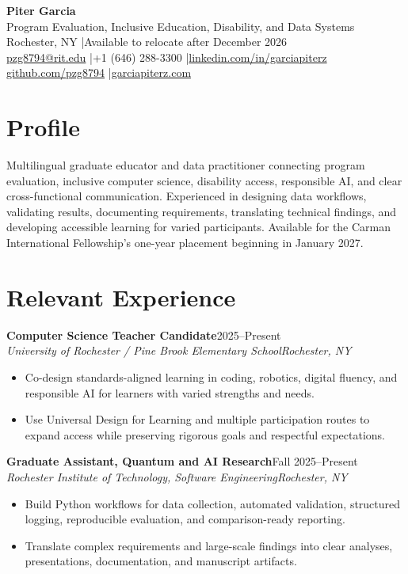 \documentclass[10pt,letterpaper]{article}
\newcommand{\role}[4]{%
  \textbf{#1}\hfill #2\\
  \textit{#3}\hfill \textit{#4}\vspace{-3pt}
}
\begin{document}
\fontsize{9}{10.4}\selectfont

\begin{center}
  {\Large\bfseries Piter Garcia}\\[1pt]
  {\large Program Evaluation, Inclusive Education, Disability, and Data Systems}\\[2pt]
  Rochester, NY \enspace|\enspace Available to relocate after December 2026\\
  \href{mailto:pzg8794@rit.edu}{pzg8794@rit.edu}
  \enspace|\enspace +1 (646) 288-3300
  \enspace|\enspace \href{https://linkedin.com/in/garciapiterz}{linkedin.com/in/garciapiterz}\\
  \href{https://github.com/pzg8794}{github.com/pzg8794}
  \enspace|\enspace \href{https://garciapiterz.com}{garciapiterz.com}
\end{center}

\section*{Profile}
Multilingual graduate educator and data practitioner connecting program
evaluation, inclusive computer science, disability access, responsible AI,
and clear cross-functional communication. Experienced in designing data
workflows, validating results, documenting requirements, translating
technical findings, and developing accessible learning for varied
participants. Available for the Carman International Fellowship's one-year
placement beginning in January 2027.

\section*{Relevant Experience}
\role{Computer Science Teacher Candidate}{2025--Present}
{University of Rochester / Pine Brook Elementary School}{Rochester, NY}
\begin{itemize}
  \item Co-design standards-aligned learning in coding, robotics, digital
    fluency, and responsible AI for learners with varied strengths and needs.
  \item Use Universal Design for Learning and multiple participation routes to
    expand access while preserving rigorous goals and respectful expectations.
\end{itemize}

\role{Graduate Assistant, Quantum and AI Research}{Fall 2025--Present}
{Rochester Institute of Technology, Software Engineering}{Rochester, NY}
\begin{itemize}
  \item Build Python workflows for data collection, automated validation,
    structured logging, reproducible evaluation, and comparison-ready
    reporting.
  \item Translate complex requirements and large-scale findings into clear
    analyses, presentations, documentation, and manuscript artifacts.
\end{itemize}
\end{document}
